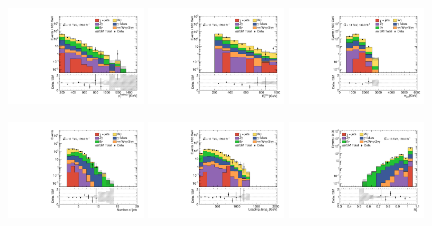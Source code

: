 \begin{figure}[ht!]
  \begin{center}

    \includegraphics[width=0.32\textwidth]{images_tmp/results/fr2/can_VRL3_ph_pt0_afterFit.pdf}
    \includegraphics[width=0.32\textwidth]{images_tmp/results/fr2/can_VRL3_met_et_afterFit.pdf}
    \includegraphics[width=0.32\textwidth]{images_tmp/results/fr2/can_VRL3_meff_afterFit.pdf}

    \includegraphics[width=0.32\textwidth]{images_tmp/results/fr2/can_VRL3_jet_n_afterFit}
    \includegraphics[width=0.32\textwidth]{images_tmp/results/fr2/can_VRL3_jet_pt0_afterFit.pdf}
    \includegraphics[width=0.32\textwidth]{images_tmp/results/fr2/can_VRL3_rt4_afterFit}


\end{center}
\end{figure}
